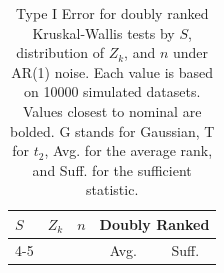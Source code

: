 \documentclass[12pt]{article}
\theoremstyle{plain}
\theoremstyle{remark}
\begin{document}
\begin{table}
	\centering
	\caption{Type I Error for doubly ranked Kruskal-Wallis tests by $S$, distribution of $Z_k$, and $n$ under AR(1) noise. Each value is based on 10000 simulated datasets. Values closest to nominal are bolded. G stands for Gaussian, T for $t_2$, Avg. for the average rank, and Suff. for the sufficient statistic. \label{t:kwe}}
	\begin{tabular}{lllcc}
		  \hline
		  \multirow{2}{*}{$S$} & \multirow{2}{*}{$Z_k$} & \multirow{2}{*}{$n$} &  \multicolumn{2}{c}{Doubly Ranked} \\
		 \cline{4-5}
		  &  &  & Avg. & Suff.  \\ 
		  \hline

\end{tabular}
\end{table}
\end{document}
